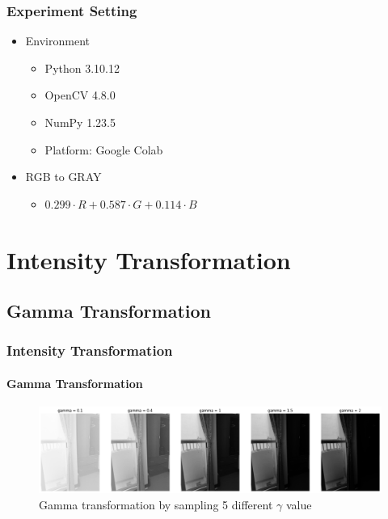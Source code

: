 \documentclass[
	11pt, %
	aspectratio=169, %
]{beamer}
\begin{document}
\begin{frame}
	\frametitle{Experiment Setting}
	
	\begin{itemize}
		\item Environment
		\begin{itemize}
			\item Python 3.10.12
			\item OpenCV 4.8.0
			\item NumPy 1.23.5
			\item Platform: Google Colab
		\end{itemize}
		\item RGB to GRAY
		\begin{itemize}
			\item $0.299 \cdot R + 0.587 \cdot G + 0.114 \cdot B$
		\end{itemize}
	 \end{itemize}
\end{frame}

\section{Intensity Transformation}

	\subsection{Gamma Transformation}
	
		\begin{frame}
			\frametitle{Intensity Transformation}
			\framesubtitle{Gamma Transformation}

			\begin{figure}[htbp]
				\includegraphics[width = \linewidth]{gamma_img.png}
				\caption{Gamma transformation by sampling 5 different $\gamma$ value}
			   	\label{fig:gamma}
			\end{figure}
		\end{frame}
\end{document}
